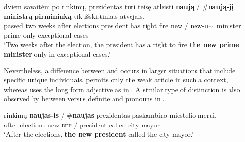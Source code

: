 \documentclass[output=paper,
modfonts
]{langscibook}
\begin{document}
\begin{exe}
\ex\label{ex:sereikaite:3}
 {dviem} {savaitėm} {po} {rinkimų}, {prezidentas} {turi} {teisę} {atleisti} \textbf{naują} \textnormal{/} \textnormal{\#}\textbf{naują-jį} \textbf{ministrą} \textbf{{pirmininką}} {tik} {išskirtiniais} {atvejais}.\\
passed two weeks after elections president has right fire new / \phantom{\#}new-\textsc{def} {minister} {prime} only exceptional cases\\
\trans `Two weeks after the election, the president has a right to fire \textbf{the new prime minister} only in exceptional cases.' 
\end{exe}

Nevertheless, a difference between  and  occurs in larger situations that include specific unique individuals.  permits only the weak article in such a context, whereas  uses the long form adjective as in . A similar type of distinction is also observed by \citet{Jenks2015} between  versus definite  and pronouns in .

\begin{exe} 
\ex \label{ex:sereikaite:4} 
 {rinkimų} \textbf{naujas-is} \textnormal{/} \textnormal{\#}\textbf{naujas} {prezidentas} {paskambino} {miestelio} {merui}.\\
after elections \phantom{\#}new-\textsc{def} / \phantom{\#}{new} president called city mayor\\
\trans `After the elections, \textbf{the new president} called the city mayor.' 
\end{exe}
\end{document}
